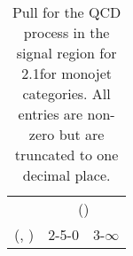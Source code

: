 \begin{table}[h!]
\tiny
\centering
\caption{Pull for the QCD process in the signal region for 2.1\ifb for monojet categories. All entries are non-zero but are truncated to one decimal place.\label{tab:pullsepnaive_sig_qcd_mono}}
\begin{tabular}
{ccc}
	\hline\hline
	& \multicolumn{2}{c}{\scalht (\gev)} \\ 
	 (\njet,  \nb) & 2-5-0 & 3-$\infty$ \\ [0.8ex] 
\hline
	\hline
	\hline
\end{tabular}
\end{table}
